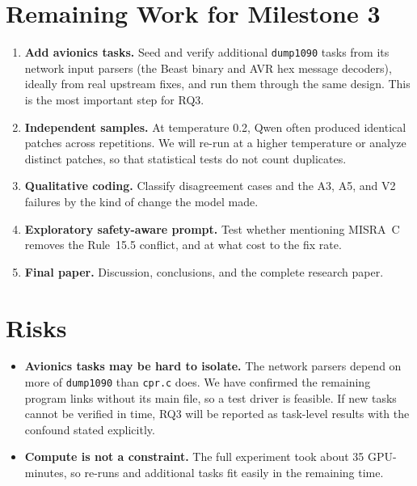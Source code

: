 \documentclass[12pt]{article}
\begin{document}
\section{Remaining Work for Milestone 3}
\begin{enumerate}[leftmargin=*]
    \item \textbf{Add avionics tasks.} Seed and verify additional \texttt{dump1090} tasks from its network input parsers (the Beast binary and AVR hex message decoders), ideally from real upstream fixes, and run them through the same design. This is the most important step for RQ3.
    \item \textbf{Independent samples.} At temperature 0.2, Qwen often produced identical patches across repetitions. We will re-run at a higher temperature or analyze distinct patches, so that statistical tests do not count duplicates.
    \item \textbf{Qualitative coding.} Classify disagreement cases and the A3, A5, and V2 failures by the kind of change the model made.
    \item \textbf{Exploratory safety-aware prompt.} Test whether mentioning MISRA~C removes the Rule~15.5 conflict, and at what cost to the fix rate.
    \item \textbf{Final paper.} Discussion, conclusions, and the complete research paper.
\end{enumerate}

\section{Risks}
\begin{itemize}[leftmargin=*]
    \item \textbf{Avionics tasks may be hard to isolate.} The network parsers depend on more of \texttt{dump1090} than \texttt{cpr.c} does. We have confirmed the remaining program links without its main file, so a test driver is feasible. If new tasks cannot be verified in time, RQ3 will be reported as task-level results with the confound stated explicitly.
    \item \textbf{Compute is not a constraint.} The full experiment took about 35 GPU-minutes, so re-runs and additional tasks fit easily in the remaining time.
\end{itemize}
\end{document}
